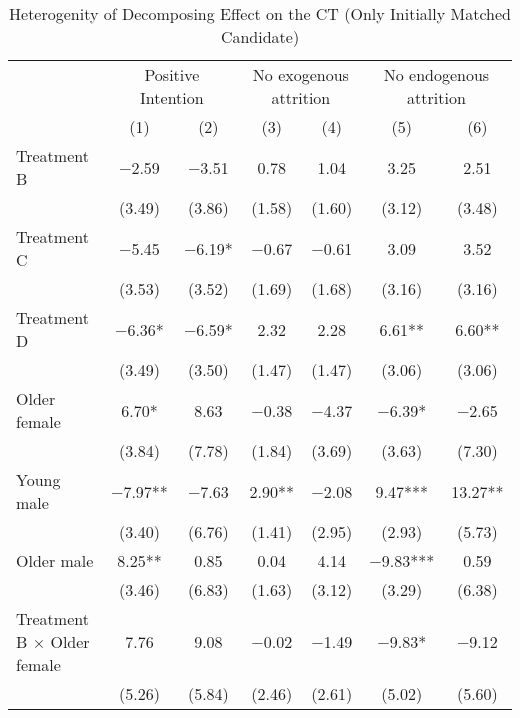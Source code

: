 \documentclass[12pt, a4paper]{article}
\begin{document}
\begin{table}[H]

\caption{\label{tab:test-decompose-interaction-reg-init}Heterogenity of Decomposing Effect on the CT (Only Initially Matched Candidate)}
\centering
\fontsize{8}{10}\selectfont
\begin{threeparttable}
\begin{tabular}[t]{lcccccc}
\toprule
\multicolumn{1}{c}{ } & \multicolumn{2}{c}{Positive Intention} & \multicolumn{2}{c}{No exogenous attrition} & \multicolumn{2}{c}{No endogenous attrition} \\
\cmidrule(l{3pt}r{3pt}){2-3} \cmidrule(l{3pt}r{3pt}){4-5} \cmidrule(l{3pt}r{3pt}){6-7}
  & (1) & (2) & (3) & (4) & (5) & (6)\\
\midrule
Treatment B & \num{-2.59} & \num{-3.51} & \num{0.78} & \num{1.04} & \num{3.25} & \num{2.51}\\
 & (\num{3.49}) & (\num{3.86}) & (\num{1.58}) & (\num{1.60}) & (\num{3.12}) & (\num{3.48})\\
Treatment C & \num{-5.45} & \num{-6.19}* & \num{-0.67} & \num{-0.61} & \num{3.09} & \num{3.52}\\
 & (\num{3.53}) & (\num{3.52}) & (\num{1.69}) & (\num{1.68}) & (\num{3.16}) & (\num{3.16})\\
Treatment D & \num{-6.36}* & \num{-6.59}* & \num{2.32} & \num{2.28} & \num{6.61}** & \num{6.60}**\\
 & (\num{3.49}) & (\num{3.50}) & (\num{1.47}) & (\num{1.47}) & (\num{3.06}) & (\num{3.06})\\
Older female & \num{6.70}* & \num{8.63} & \num{-0.38} & \num{-4.37} & \num{-6.39}* & \num{-2.65}\\
 & (\num{3.84}) & (\num{7.78}) & (\num{1.84}) & (\num{3.69}) & (\num{3.63}) & (\num{7.30})\\
Young male & \num{-7.97}** & \num{-7.63} & \num{2.90}** & \num{-2.08} & \num{9.47}*** & \num{13.27}**\\
 & (\num{3.40}) & (\num{6.76}) & (\num{1.41}) & (\num{2.95}) & (\num{2.93}) & (\num{5.73})\\
Older male & \num{8.25}** & \num{0.85} & \num{0.04} & \num{4.14} & \num{-9.83}*** & \num{0.59}\\
 & (\num{3.46}) & (\num{6.83}) & (\num{1.63}) & (\num{3.12}) & (\num{3.29}) & (\num{6.38})\\
Treatment B $\times$ Older female & \num{7.76} & \num{9.08} & \num{-0.02} & \num{-1.49} & \num{-9.83}* & \num{-9.12}\\
 & (\num{5.26}) & (\num{5.84}) & (\num{2.46}) & (\num{2.61}) & (\num{5.02}) & (\num{5.60})\\

\end{tabular}
\end{threeparttable}
\end{table}
\end{document}
